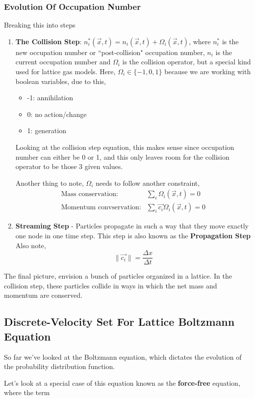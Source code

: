 \documentclass{article}
\begin{document}
\subsubsection{Evolution Of Occupation Number}
Breaking this into steps
\begin{enumerate}
	\item \textbf{The Collision Step}: $n_i^*(\vec{x},t) = n_i(\vec{x},t) + \Omega_i(\vec{x},t)$, where $n_i^*$ is the new occupation number or ``post-collision" occupation number, $n_i$ is the current occupation number and $\Omega_i$ is the collision operator, but a special kind used for lattice gas models. Here, $\Omega_i \in \{-1,0,1\}$ because we are working with boolean variables, due to this,
		\begin{itemize}
			\item -1: annihilation
			\item 0: no action/change
			\item 1: generation
		\end{itemize}
Looking at the collision step equation, this makes sense since occupation number can either be 0 or 1, and this only leaves room for the collision operator to be those 3 given values.

Another thing to note, $\Omega_i$ needs to follow another constraint, 
\begin{align*}
	\text{Mass conservation}:&\sum_i \Omega_i (\vec{x},t) = 0 \\
	\text{Momentum convservation}:&\sum_i \vec{c_i} \Omega_i(\vec{x},t) = 0
\end{align*}
\item \textbf{Streaming Step} -   Particles propagate in such a way that they move exactly one node in one time step. This step is also known as the \textbf{Propagation Step} Also note,
	\[
		\| \vec{c_i}\| = \frac{\Delta x}{\Delta t}
	\]
\end{enumerate}

The final picture, envision a bunch of particles organized in a lattice. In the collision step, these particles collide in ways in which the net mass and momentum are conserved.
\subsection{Discrete-Velocity Set For Lattice Boltzmann Equation}
So far we've looked at the Boltzmann equation, which dictates the evolution of the probability distribution function.

Let's look at a special case of this equation known as the \textbf{force-free} equation, where the term 
\end{document}
